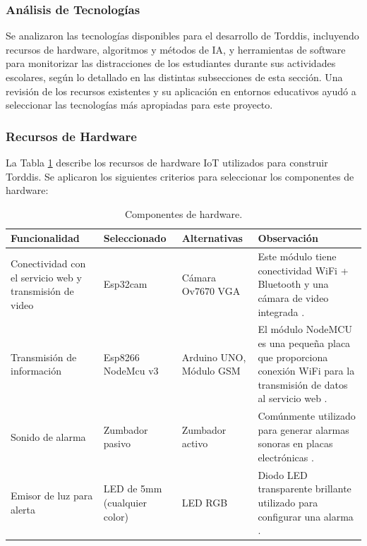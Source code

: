 \documentclass[a4paper,fleqn]{cas-sc}
\begin{document}
		\subsubsection{Análisis de Tecnologías}
		Se analizaron las tecnologías disponibles para el desarrollo de Torddis, incluyendo recursos de hardware, algoritmos y métodos de IA, y herramientas de software para monitorizar las distracciones de los estudiantes durante sus actividades escolares, según lo detallado en las distintas subsecciones de esta sección. Una revisión de los recursos existentes y su aplicación en entornos educativos ayudó a seleccionar las tecnologías más apropiadas para este proyecto.
		
		\subsubsection*{Recursos de Hardware}
		La Tabla \ref{table:hardware-components} describe los recursos de hardware IoT utilizados para construir Torddis. Se aplicaron los siguientes criterios para seleccionar los componentes de hardware:
		
		\begin{table}[htb]
			\caption{Componentes de hardware.}
			\label{table:hardware-components}
			\centering
			\begin{tabular}{p{}p{0.15\textwidth}p{}p{}}
				\hline
				\multicolumn{1}{l}{\textbf{Funcionalidad}} & \multicolumn{1}{l}{\textbf{Seleccionado}} & \multicolumn{1}{l}{\textbf{Alternativas}} & \multicolumn{1}{l}{\textbf{Observación}} \\ \hline
				Conectividad con el servicio web y transmisión de video & Esp32cam & Cámara Ov7670 VGA & Este módulo tiene conectividad WiFi + Bluetooth y una cámara de video integrada \citep{CasasSanchez2022}. \\
				Transmisión de información & Esp8266 NodeMcu v3 & Arduino UNO, Módulo GSM & El módulo NodeMCU es una pequeña placa que proporciona conexión WiFi para la transmisión de datos al servicio web \citep{Barai2019}. \\
				Sonido de alarma & Zumbador pasivo & Zumbador activo & Comúnmente utilizado para generar alarmas sonoras en placas electrónicas \citep{Adebisi2023development}. \\
				Emisor de luz para alerta & LED de 5mm (cualquier color) & LED RGB & Diodo LED transparente brillante utilizado para configurar una alarma \citep{Upender2020}.  \\ \hline
			\end{tabular}
		\end{table}
		
\end{document}
